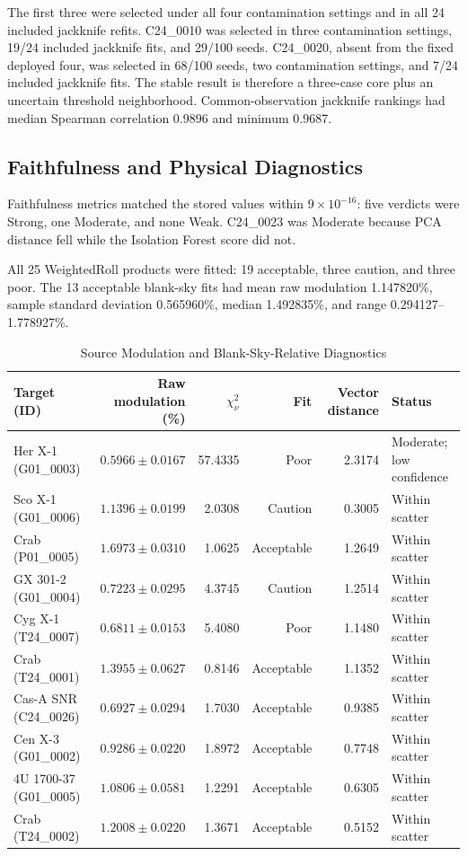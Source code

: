 \documentclass[conference]{IEEEtran}
\begin{document}
The first three were selected under all four contamination settings and in all 24 included jackknife refits. C24\_0010 was selected in three contamination settings, 19/24 included jackknife fits, and 29/100 seeds. C24\_0020, absent from the fixed deployed four, was selected in 68/100 seeds, two contamination settings, and 7/24 included jackknife fits. The stable result is therefore a three-case core plus an uncertain threshold neighborhood. Common-observation jackknife rankings had median Spearman correlation 0.9896 and minimum 0.9687.

\subsection{Faithfulness and Physical Diagnostics}

Faithfulness metrics matched the stored values within \(9\times10^{-16}\): five verdicts were Strong, one Moderate, and none Weak. C24\_0023 was Moderate because PCA distance fell while the Isolation Forest score did not.

All 25 WeightedRoll products were fitted: 19 acceptable, three caution, and three poor. The 13 acceptable blank-sky fits had mean raw modulation 1.147820\%, sample standard deviation 0.565960\%, median 1.492835\%, and range 0.294127--1.778927\%.

\begin{table}[t]
\caption{Source Modulation and Blank-Sky-Relative Diagnostics}
\label{tab:physical}
\centering
\small
\begin{tabular}{lrrrrl}
\toprule
Target (ID) & Raw modulation (\%) & \(\chi_\nu^2\) & Fit & Vector distance & Status \\
\midrule
Her X-1 (G01\_0003) & \(0.5966\pm0.0167\) & 57.4335 & Poor & 2.3174 & Moderate; low confidence \\
Sco X-1 (G01\_0006) & \(1.1396\pm0.0199\) & 2.0308 & Caution & 0.3005 & Within scatter \\
Crab (P01\_0005) & \(1.6973\pm0.0310\) & 1.0625 & Acceptable & 1.2649 & Within scatter \\
GX 301-2 (G01\_0004) & \(0.7223\pm0.0295\) & 4.3745 & Caution & 1.2514 & Within scatter \\
Cyg X-1 (T24\_0007) & \(0.6811\pm0.0153\) & 5.4080 & Poor & 1.1480 & Within scatter \\
Crab (T24\_0001) & \(1.3955\pm0.0627\) & 0.8146 & Acceptable & 1.1352 & Within scatter \\
Cas-A SNR (C24\_0026) & \(0.6927\pm0.0294\) & 1.7030 & Acceptable & 0.9385 & Within scatter \\
Cen X-3 (G01\_0002) & \(0.9286\pm0.0220\) & 1.8972 & Acceptable & 0.7748 & Within scatter \\
4U 1700-37 (G01\_0005) & \(1.0806\pm0.0581\) & 1.2291 & Acceptable & 0.6305 & Within scatter \\
Crab (T24\_0002) & \(1.2008\pm0.0220\) & 1.3671 & Acceptable & 0.5152 & Within scatter \\
\bottomrule
\end{tabular}
\end{table}
\end{document}
